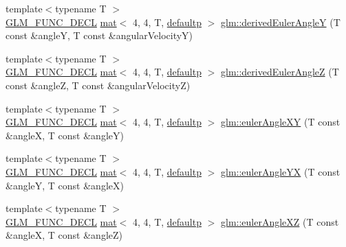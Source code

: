 \begin{DoxyCompactItemize}
\item 
{\footnotesize template$<$typename T $>$ }\\\hyperlink{setup_8hpp_ab2d052de21a70539923e9bcbf6e83a51}{G\+L\+M\+\_\+\+F\+U\+N\+C\+\_\+\+D\+E\+CL} \hyperlink{structglm_1_1mat}{mat}$<$ 4, 4, T, \hyperlink{namespaceglm_a36ed105b07c7746804d7fdc7cc90ff25a9d21ccd8b5a009ec7eb7677befc3bf51}{defaultp} $>$ \hyperlink{group__gtx__euler__angles_ga0a4c56ecce7abcb69508ebe6313e9d10}{glm\+::derived\+Euler\+AngleY} (T const \&angleY, T const \&angular\+VelocityY)
\item 
{\footnotesize template$<$typename T $>$ }\\\hyperlink{setup_8hpp_ab2d052de21a70539923e9bcbf6e83a51}{G\+L\+M\+\_\+\+F\+U\+N\+C\+\_\+\+D\+E\+CL} \hyperlink{structglm_1_1mat}{mat}$<$ 4, 4, T, \hyperlink{namespaceglm_a36ed105b07c7746804d7fdc7cc90ff25a9d21ccd8b5a009ec7eb7677befc3bf51}{defaultp} $>$ \hyperlink{group__gtx__euler__angles_gae8b397348201c42667be983ba3f344df}{glm\+::derived\+Euler\+AngleZ} (T const \&angleZ, T const \&angular\+VelocityZ)
\item 
{\footnotesize template$<$typename T $>$ }\\\hyperlink{setup_8hpp_ab2d052de21a70539923e9bcbf6e83a51}{G\+L\+M\+\_\+\+F\+U\+N\+C\+\_\+\+D\+E\+CL} \hyperlink{structglm_1_1mat}{mat}$<$ 4, 4, T, \hyperlink{namespaceglm_a36ed105b07c7746804d7fdc7cc90ff25a9d21ccd8b5a009ec7eb7677befc3bf51}{defaultp} $>$ \hyperlink{group__gtx__euler__angles_ga64036577ee17a2d24be0dbc05881d4e2}{glm\+::euler\+Angle\+XY} (T const \&angleX, T const \&angleY)
\item 
{\footnotesize template$<$typename T $>$ }\\\hyperlink{setup_8hpp_ab2d052de21a70539923e9bcbf6e83a51}{G\+L\+M\+\_\+\+F\+U\+N\+C\+\_\+\+D\+E\+CL} \hyperlink{structglm_1_1mat}{mat}$<$ 4, 4, T, \hyperlink{namespaceglm_a36ed105b07c7746804d7fdc7cc90ff25a9d21ccd8b5a009ec7eb7677befc3bf51}{defaultp} $>$ \hyperlink{group__gtx__euler__angles_ga4f57e6dd25c3cffbbd4daa6ef3f4486d}{glm\+::euler\+Angle\+YX} (T const \&angleY, T const \&angleX)
\item 
{\footnotesize template$<$typename T $>$ }\\\hyperlink{setup_8hpp_ab2d052de21a70539923e9bcbf6e83a51}{G\+L\+M\+\_\+\+F\+U\+N\+C\+\_\+\+D\+E\+CL} \hyperlink{structglm_1_1mat}{mat}$<$ 4, 4, T, \hyperlink{namespaceglm_a36ed105b07c7746804d7fdc7cc90ff25a9d21ccd8b5a009ec7eb7677befc3bf51}{defaultp} $>$ \hyperlink{group__gtx__euler__angles_gaa39bd323c65c2fc0a1508be33a237ce9}{glm\+::euler\+Angle\+XZ} (T const \&angleX, T const \&angleZ)

\end{DoxyCompactItemize}
